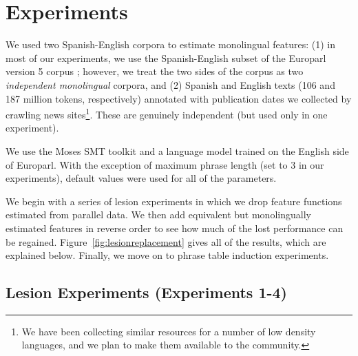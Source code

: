 \documentclass[11pt]{article}
\newcommand{\mnote}[1]{\marginpar{%
  \vskip-\baselineskip
  \raggedright\footnotesize
  \itshape\hrule\smallskip\tiny{#1}\par\smallskip\hrule}}
\newcommand{\mtodo}[1]{\mnote{\textcolor{red}{#1}}}
\newcommand{\todo}[1]{\textcolor{red}{TODO: #1}}
\newcommand{\figref}[1]{Figure~\ref{#1}}
\begin{document}


\section{Experiments} \label{sect:exp}

We used two Spanish-English corpora to estimate monolingual features: (1) in most of our experiments, we use the Spanish-English subset of the Europarl version 5 corpus \cite{Koehn:2005}; however, we treat the two sides of the corpus as two {\em independent monolingual} corpora, and (2)  Spanish and English texts (106 and 187 million tokens, respectively) annotated with publication dates we collected by crawling news sites\footnote{We have been collecting similar resources for a number of low density languages, and we plan to make them available to the community.}. These are genuinely independent (but used only in one experiment).

We use the Moses SMT toolkit\mtodo{Add a moses citation} and a language model trained on the English side of Europarl.  With the exception of maximum phrase length (set to 3 in our experiments\mtodo{Add the phrase length vs. performance curve?}), default values were used for all of the parameters.  

We begin with a series of lesion experiments in which we drop feature functions estimated from parallel data.  We then add equivalent but monolingually estimated features in reverse order to see how much of the lost performance can be regained.  \figref{fig:lesionreplacement} gives all of the results, which are explained below. Finally, we move on to phrase table induction experiments.

\subsection{Lesion Experiments (Experiments 1-4)}  \label{sect:exp:lesions}
\end{document}
